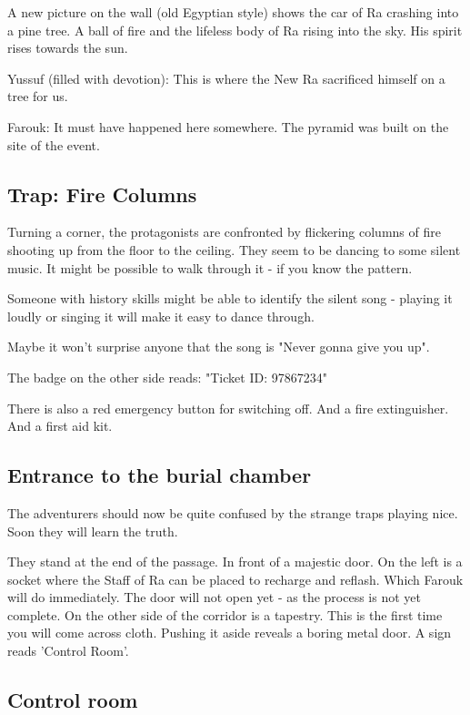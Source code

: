A new picture on the wall (old Egyptian style) shows the car of Ra crashing into a pine tree. A ball of fire and the lifeless body of Ra rising into the sky. His spirit rises towards the sun.

Yussuf (filled with devotion): This is where the New Ra sacrificed himself on a tree for us.

Farouk: It must have happened here somewhere. The pyramid was built on the site of the event.


\subsection{Trap: Fire Columns}

Turning a corner, the protagonists are confronted by flickering columns of fire shooting up from the floor to the ceiling. They seem to be dancing to some silent music.
It might be possible to walk through it - if you know the pattern.

Someone with history skills might be able to identify the silent song - playing it loudly or singing it will make it easy to dance through.

Maybe it won't surprise anyone that the song is "Never gonna give you up".

The badge on the other side reads: "Ticket ID: 97867234"

There is also a red emergency button for switching off. And a fire extinguisher. And a first aid kit.

\subsection{Entrance to the burial chamber}

The adventurers should now be quite confused by the strange traps playing nice. Soon they will learn the truth.

They stand at the end of the passage. In front of a majestic door. On the left is a socket where the Staff of Ra can be placed to recharge and reflash. Which Farouk will do immediately. The door will not open yet - as the process is not yet complete.
On the other side of the corridor is a tapestry. This is the first time you will come across cloth. Pushing it aside reveals a boring metal door. A sign reads 'Control Room'.

\subsection{Control room}

